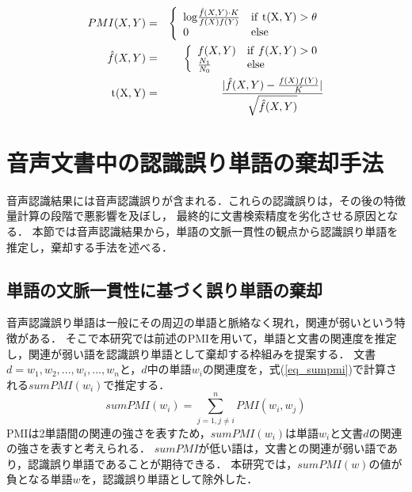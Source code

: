 \begin{eqnarray}
    PMI(X,Y) &  =  & \left\{
        \begin{array}{ll}
            {\rm log} \frac{\hat{f}(X,Y) \cdot K}{f(X)f(Y)} & {\rm if\ t(X,Y)} > \theta	\\
            0 & {\rm else} \label{eq_smoothed_pmi} \\
        \end{array}
    \right.\\
    \hat{f}(X,Y)  & =  & \left\{
        \begin{array}{ll}
            f(X,Y) & {\rm if}\ f(X,Y) > 0 \\
            \frac{N_1}{N_0} & {\rm else}  \label{eq_turing} \\
        \end{array}
    \right.\\ 
    {\rm t(X,Y)}  & =  & \frac{|\hat{f}(X,Y) - \frac{f(X)f(Y)}{K}|}{\sqrt{\hat{f}(X,Y)}}	\label{eq_t}
\end{eqnarray}

\section{音声文書中の認識誤り単語の棄却手法}
音声認識結果には音声認識誤りが含まれる．これらの認識誤りは，その後の特徴量計算の段階で悪影響を及ぼし，
最終的に文書検索精度を劣化させる原因となる．
本節では音声認識結果から，単語の文脈一貫性の観点から認識誤り単語を推定し，棄却する手法を述べる．
%


\subsection{単語の文脈一貫性に基づく誤り単語の棄却}  \label{sec_word_rejection}
音声認識誤り単語は一般にその周辺の単語と脈絡なく現れ，関連が弱いという特徴がある．
そこで本研究では前述のPMIを用いて，単語と文書の関連度を推定し，関連が弱い語を認識誤り単語として棄却する枠組みを提案する．
文書$d = {w_1, w_2, ..., w_i, ..., w_n}$と，$d$中の単語$w_i$の関連度を，式(\ref{eq_sumpmi})で計算される$sumPMI(w_i)$で推定する．
\begin{equation}
    sumPMI(w_i) = \sum^{n}_{j=1, j \neq i}{PMI(w_i, w_j)}   \label{eq_sumpmi}
\end{equation}
PMIは2単語間の関連の強さを表すため，$sumPMI(w_i)$は単語$w_i$と文書$d$の関連の強さを表すと考えられる．
$sumPMI$が低い語は，文書との関連が弱い語であり，認識誤り単語であることが期待できる．
本研究では，$sumPMI(w)$の値が負となる単語$w$を，認識誤り単語として除外した．


